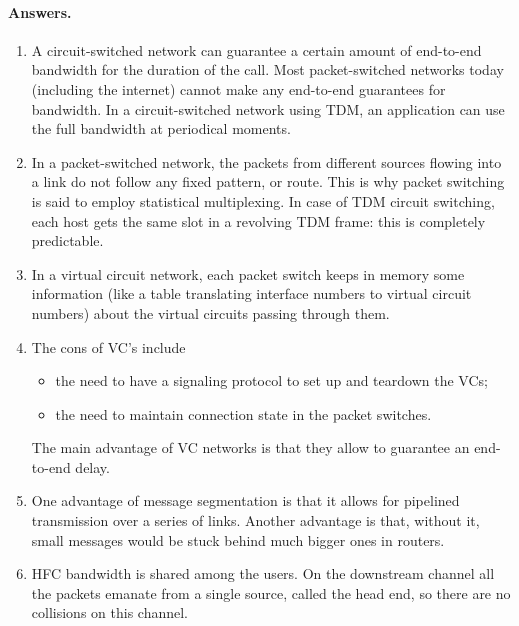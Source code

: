 
\paragraph{Answers.}

\begin{enumerate}

  \item A circuit-switched network can guarantee a certain amount of
    end-to-end bandwidth for the duration of the call. Most
    packet-switched networks today (including the internet) cannot
    make any end-to-end guarantees for bandwidth. In a
    circuit-switched network using TDM, an application can use the
    full bandwidth at periodical moments.

  \item In a packet-switched network, the packets from different
    sources flowing into a link do not follow any fixed pattern, or
    route. This is why packet switching is said to employ statistical
    multiplexing. In case of TDM circuit switching, each host gets the
    same slot in a revolving TDM frame: this is completely
    predictable.

  \item In a virtual circuit network, each packet switch keeps in
    memory some information (like a table translating interface
    numbers to virtual circuit numbers) about the virtual circuits
    passing through them.

  \item The cons of VC's include
   \begin{itemize}

     \item the need to have a signaling protocol to set up and
       teardown the VCs;
  
     \item the need to maintain connection state in the packet
       switches.

   \end{itemize}
   The main advantage of VC networks is that they allow to guarantee
   an end-to-end delay.

  \item One advantage of message segmentation is that it allows for
    pipelined transmission over a series of links. Another advantage
    is that, without it, small messages would be stuck behind much
    bigger ones in routers.

  \item HFC bandwidth is shared among the users. On the downstream
    channel all the packets emanate from a single source, called the
    head end, so there are no collisions on this channel.


\end{enumerate}
